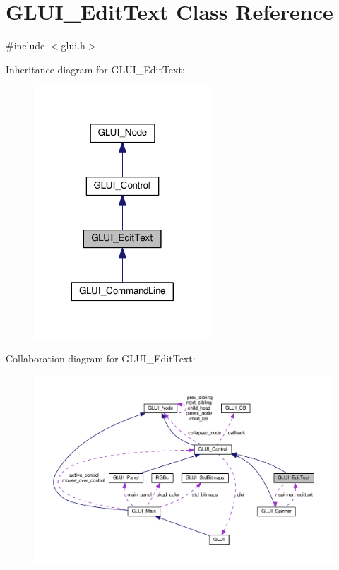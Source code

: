 \hypertarget{class_g_l_u_i___edit_text}{\section{G\+L\+U\+I\+\_\+\+Edit\+Text Class Reference}
\label{class_g_l_u_i___edit_text}
}


{\ttfamily \#include $<$glui.\+h$>$}



Inheritance diagram for G\+L\+U\+I\+\_\+\+Edit\+Text\+:\nopagebreak
\begin{figure}[H]
\begin{center}
\leavevmode
\includegraphics[width=188pt]{class_g_l_u_i___edit_text__inherit__graph}
\end{center}
\end{figure}


Collaboration diagram for G\+L\+U\+I\+\_\+\+Edit\+Text\+:\nopagebreak
\begin{figure}[H]
\begin{center}
\leavevmode
\includegraphics[width=350pt]{class_g_l_u_i___edit_text__coll__graph}
\end{center}
\end{figure}
